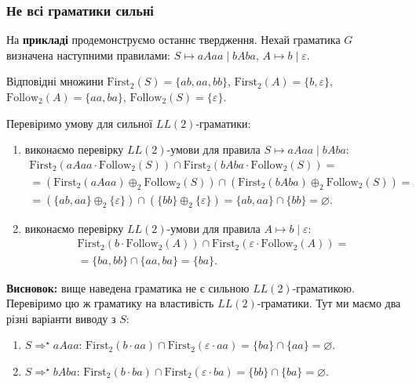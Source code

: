 \subsubsection{Не всі граматики сильні}

На \textbf{прикладі} продемонструємо останнє твердження. Нехай граматика $G$ визначена наступними правилами: $S \mapsto aAaa \mid bAba$, $A \mapsto b \mid \varepsilon$. \medskip

Відповідні множини $\text{First}_2(S) = \{ab, aa, bb\}$, $\text{First}_2(A) = \{b, \varepsilon\}$, $\text{Follow}_2(A) = \{aa, ba\}$, $\text{Follow}_2(S) = \{\varepsilon\}$. \medskip

Перевіримо умову для сильної $LL(2)$-граматики:
\begin{enumerate}
	\item  виконаємо перевірку $LL(2)$-умови для правила $S \mapsto aAaa \mid bAba$:
	\begin{multline*}
	\text{First}_2(aAaa \cdot \text{Follow}_2(S)) \cap \text{First}_2(bAba \cdot \text{Follow}_2(S)) = \\
	= (\text{First}_2(aAaa) \oplus_2 \text{Follow}_2(S)) \cap (\text{First}_2(bAba) \oplus_2 \text{Follow}_2(S)) = \\
	= (\{ab, aa\} \oplus_2 \{\varepsilon\}) \cap (\{bb\} \oplus_2 \{\varepsilon\}) = \{ab,aa\}\cap \{bb\} = \varnothing.
	\end{multline*}
	\item виконаємо перевірку $LL(2)$-умови для правила $A \mapsto b \mid \varepsilon$:
	\begin{multline*}
	\text{First}_2(b \cdot \text{Follow}_2(A)) \cap \text{First}_2(\varepsilon \cdot \text{Follow}_2(A)) = \\
	= \{ba,bb\}\cap\{aa,ba\}=\{ba\}.
	\end{multline*}
\end{enumerate}

\textbf{Висновок:} вище наведена граматика не є сильною $LL(2)$-граматикою. Перевіримо цю ж граматику на властивість $LL(2)$-граматики. Тут ми маємо два різні варіанти виводу з $S$:
\begin{enumerate}
	\item $S \Rightarrow^\star aAaa$: $\text{First}_2(b \cdot aa) \cap \text{First}_2(\varepsilon \cdot aa) = \{ba\} \cap \{aa\} = \varnothing$.
	\item $S \Rightarrow^\star bAba$: $\text{First}_2(b \cdot ba) \cap \text{First}_2(\varepsilon \cdot ba) = \{bb\} \cap \{ba\} = \varnothing$.
\end{enumerate}

